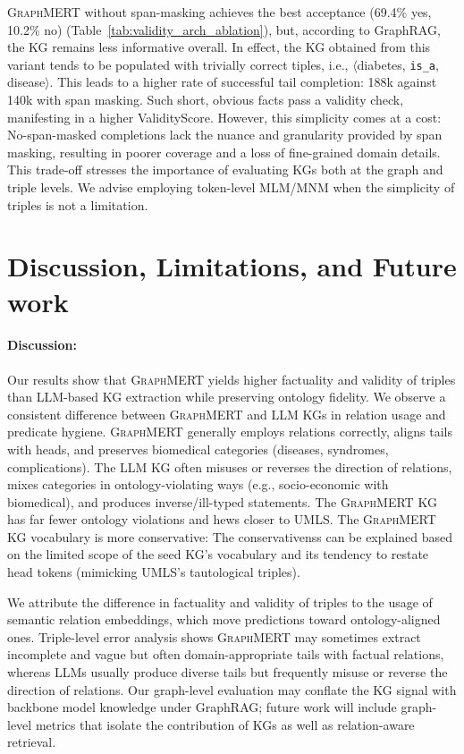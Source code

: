\documentclass[10pt]{article}
\newcommand{\ours}{\textsc{GraphMERT}\xspace}
\begin{document}
\ours without span-masking achieves the best acceptance (69.4\% yes, 10.2\% no) (Table~\ref{tab:validity_arch_ablation}), but, according to GraphRAG, the KG remains less informative overall. In effect, the KG obtained from this variant tends to be populated with trivially correct tiples, i.e., $\langle$diabetes, \texttt{is\_a}, disease$\rangle$. This leads to a higher rate of successful tail completion: 188k against 140k with span masking. Such short, obvious facts pass a validity check, manifesting in a higher ValidityScore. However, this simplicity comes at a cost: No-span-masked completions lack the nuance and granularity provided by span masking, resulting in poorer coverage and a loss of fine-grained domain details. This trade-off stresses the importance of evaluating KGs both at the graph and triple levels. We advise employing token-level MLM/MNM when the simplicity of triples is not a limitation.

\section{Discussion, Limitations, and Future work}
\label{sec:discussion}

\paragraph{Discussion:}
Our results show that \ours yields higher factuality and validity of triples than LLM-based KG extraction while preserving ontology fidelity. 
We observe a consistent difference between \ours and LLM KGs in relation usage and predicate hygiene. \ours generally employs relations correctly, aligns tails with heads, and preserves biomedical categories (diseases, syndromes, complications). The LLM KG often misuses or reverses the direction of relations, mixes categories in ontology-violating ways (e.g., socio-economic with biomedical), and produces inverse/ill-typed statements. The \ours KG has far fewer ontology violations and hews closer to UMLS. The \ours KG vocabulary is more conservative: The conservativenss can be explained based on the limited scope of the seed KG’s vocabulary and its tendency to restate head tokens (mimicking UMLS’s tautological triples). 

We attribute the difference in factuality and validity of triples to the usage of semantic relation embeddings, which move predictions toward ontology-aligned ones. Triple-level error analysis shows \ours may sometimes extract incomplete and vague but often domain-appropriate tails with factual relations, whereas LLMs usually produce diverse tails but frequently misuse or reverse the direction of relations. Our graph-level evaluation may conflate the KG signal with backbone model knowledge under GraphRAG; future work will include graph-level metrics that isolate the contribution of KGs as well as relation-aware retrieval. 
\end{document}
